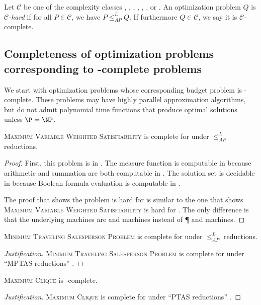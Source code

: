 \documentclass[]{article}
\newenvironment{justification}{\begin{proof}[Justification]}{\end{proof}}
\newcommand{\APr}{\leq_{AP}^{L}}
\begin{document}
\begin{definition}
  Let $\mathcal{C}$ be one of the complexity classes \NCO, \NCAS, \ApxNCO, \logApxNCO, \polyApxNCO, \expApxNCO, or \NNCO.
  An optimization problem $Q$ is \emph{$\mathcal{C}$-hard} if for all $P\in\mathcal{C}$, we have $P\APr Q$.
  If furthermore $Q\in\mathcal{C}$, we say it is $\mathcal{C}$-complete.
\end{definition}

\subsection{Completeness of optimization problems corresponding to \texorpdfstring{\NP}{NP}-complete problems}

We start with optimization problems whose corresponding budget problem is \NP-complete.
These problems may have highly parallel approximation algorithms, but do not admit polynomial time functions that produce optimal solutions unless $\P = \NP$.

\begin{theorem}
  \textsc{Maximum Variable Weighted Satisfiability} is complete for \NNCO{} under $\APr$ reductions.
\end{theorem}
\begin{proof}
  First, this problem is in \NNCO.
  The measure function is computable in \FNC{} because arithmetic and summation are both computable in \FNC{}.
  The solution set is decidable in \NC{} because Boolean formula evaluation is computable in \NC{} \cite{buss87}.

  The proof that shows the problem is hard for \NNCO{} is similar to the one that shows \textsc{Maximum Variable Weighted Satisfiability} is hard for \NPO{} \cite[Theorem~3.1]{om87} \cite[Theorem~8.3]{acgkmp99}.
  The only difference is that the underlying machines are \NC{} and \NNC{} machines instead of \P{} and \NP{} machines.
\end{proof}

\begin{conjecture}
  \textsc{Minimum Traveling Salesperson Problem} is complete for \expApxNCO{} under $\APr$ reductions.
\end{conjecture}
\begin{justification}
  \textsc{Minimum Traveling Salesperson Problem} is complete for \expApxPO{} under ``MPTAS reductions'' \cite[Corollary~1]{ep06}.
\end{justification}

\begin{conjecture}
  \textsc{Maximum Clique} is \polyApxNCO-complete.
\end{conjecture}
\begin{justification}
  \textsc{Maximum Clique} is complete for \polyApxPO{} under ``PTAS reductions'' \cite[Example~2.48]{cks01} \cite{kmsv99} \cite{ep10}.
\end{justification}
\end{document}
